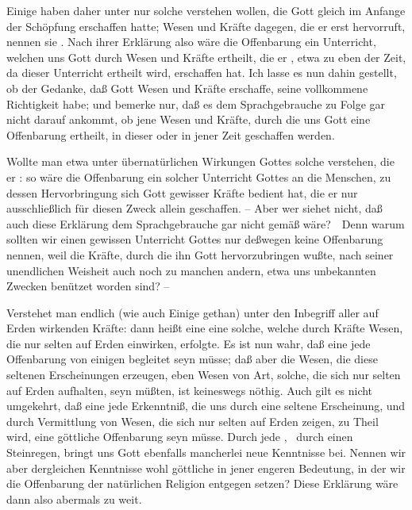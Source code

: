\begin{aufza}
\begin{aufzb}
\begin{aufzc}
\item Einige haben daher unter  nur solche verstehen wollen, die Gott gleich im Anfange der Schöpfung erschaffen hatte; Wesen und Kräfte dagegen, die er erst  hervorruft, nennen sie . Nach ihrer Erklärung also wäre die Offenbarung ein Unterricht, welchen uns Gott durch Wesen und Kräfte ertheilt, die er , etwa zu eben der Zeit, da dieser Unterricht ertheilt wird, erschaffen hat. Ich lasse es nun dahin gestellt, ob der Gedanke, daß Gott  Wesen und Kräfte erschaffe, seine vollkommene Richtigkeit habe; und bemerke nur, daß es dem Sprachgebrauche zu Folge gar nicht darauf ankommt, ob jene Wesen und Kräfte, durch die uns Gott eine Offenbarung ertheilt, in dieser oder in jener Zeit geschaffen werden.
\item Wollte man etwa unter übernatürlichen Wirkungen Gottes solche verstehen, die er : so wäre die Offenbarung ein solcher Unterricht Gottes an die Menschen, zu dessen Hervorbringung sich Gott gewisser Kräfte bedient hat, die er nur ausschließlich für diesen Zweck allein geschaffen. -- Aber wer siehet nicht, daß auch diese Erklärung dem Sprachgebrauche gar nicht gemäß wäre?~\ Denn warum sollten wir einen gewissen Unterricht Gottes nur deßwegen keine Offenbarung nennen, weil die Kräfte, durch die ihn Gott hervorzubringen wußte, nach seiner unendlichen Weisheit auch noch zu manchen andern, etwa uns unbekannten Zwecken benützet worden sind? --
\item Verstehet man endlich (wie auch  Einige gethan) unter  den Inbegriff aller auf Erden  wirkenden Kräfte: dann heißt eine  eine solche, welche durch Kräfte  Wesen, die nur selten auf Erden einwirken, erfolgte. Es ist nun wahr, daß eine jede Offenbarung von einigen  begleitet seyn müsse; daß aber die Wesen, die diese seltenen Erscheinungen erzeugen, eben Wesen von  Art, solche, die sich nur selten auf Erden aufhalten, seyn müßten, ist keineswegs nöthig. Auch gilt es nicht umgekehrt, daß eine jede Erkenntniß, die uns durch eine seltene Erscheinung, und durch Vermittlung von Wesen, die sich nur selten auf Erden zeigen, zu Theil wird, eine göttliche Offenbarung seyn müsse. Durch jede , \zB\ durch einen Steinregen, bringt uns Gott ebenfalls mancherlei neue Kenntnisse bei. Nennen wir aber dergleichen Kenntnisse wohl göttliche  in jener engeren Bedeutung, in der wir die Offenbarung der natürlichen Religion entgegen setzen? Diese Erklärung wäre dann also abermals zu weit.

\end{aufzc}
\end{aufzb}
\end{aufza}
